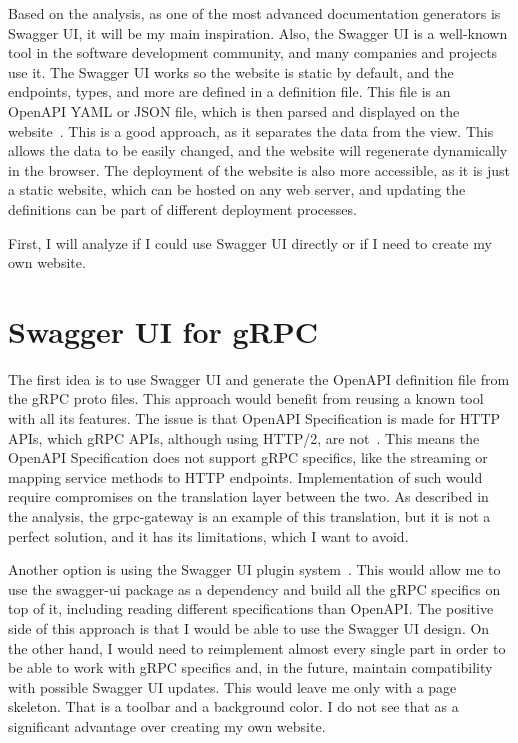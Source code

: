 Based on the analysis, as one of the most advanced documentation generators is Swagger UI, it will be my main inspiration.
Also, the Swagger UI is a well-known tool in the software development community, and many companies and projects use it.
The Swagger UI works so the website is static by default, and the endpoints, types, and more are defined in a definition file.
This file is an OpenAPI YAML or JSON file, which is then parsed and displayed on the website~\cite{swagger-ui-definition-file}.
This is a good approach, as it separates the data from the view.
This allows the data to be easily changed, and the website will regenerate dynamically in the browser.
The deployment of the website is also more accessible, as it is just a static website, which can be hosted on any web server, and updating the definitions can be part of different deployment processes.

First, I will analyze if I could use Swagger UI directly or if I need to create my own website.


\section{Swagger UI for gRPC}
The first idea is to use Swagger UI and generate the OpenAPI definition file from the gRPC proto files.
This approach would benefit from reusing a known tool with all its features.
The issue is that OpenAPI Specification is made for HTTP APIs, which gRPC APIs, although using HTTP/2, are not~\cite{openapi-specification}.
This means the OpenAPI Specification does not support gRPC specifics, like the streaming or mapping service methods to HTTP endpoints.
Implementation of such would require compromises on the translation layer between the two.
As described in the analysis, the grpc-gateway is an example of this translation, but it is not a perfect solution, and it has its limitations, which I want to avoid.

Another option is using the Swagger UI plugin system~\cite{swagger-ui-plugins}.
This would allow me to use the swagger-ui package as a dependency and build all the gRPC specifics on top of it, including reading different specifications than OpenAPI\@.
The positive side of this approach is that I would be able to use the Swagger UI design.
On the other hand, I would need to reimplement almost every single part in order to be able to work with gRPC specifics and, in the future, maintain compatibility with possible Swagger UI updates.
This would leave me only with a page skeleton.
That is a toolbar and a background color.
I do not see that as a significant advantage over creating my own website.

